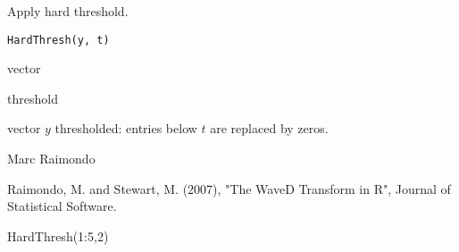 \begin{Description}\relax
Apply hard threshold.
\end{Description}
\begin{Usage}
\begin{verbatim}
HardThresh(y, t)
\end{verbatim}
\end{Usage}
\begin{Arguments}
\begin{ldescription}
\item[\code{y}] vector
\item[\code{t}] threshold 
\end{ldescription}
\end{Arguments}
\begin{Value}
vector $y$ thresholded:  entries below $t$ are replaced by zeros.
\end{Value}
\begin{Author}\relax
Marc Raimondo
\end{Author}
\begin{References}\relax
Raimondo, M. and Stewart, M. (2007),
"The WaveD Transform in R", Journal of Statistical Software.
\end{References}
\begin{SeeAlso}\relax
{}
\end{SeeAlso}
\begin{Examples}
\begin{ExampleCode}
HardThresh(1:5,2)
  \end{ExampleCode}
\end{Examples}


